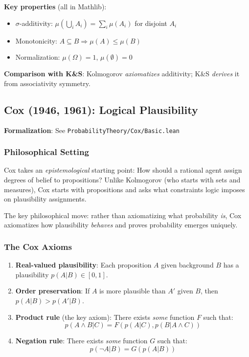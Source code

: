 \documentclass[11pt]{article}
\theoremstyle{definition}
\theoremstyle{remark}
\begin{document}
\textbf{Key properties} (all in Mathlib):
\begin{itemize}
\item $\sigma$-additivity: $\mu(\bigcup_i A_i) = \sum_i \mu(A_i)$ for disjoint $A_i$
\item Monotonicity: $A \subseteq B \Rightarrow \mu(A) \leq \mu(B)$
\item Normalization: $\mu(\Omega) = 1$, $\mu(\emptyset) = 0$
\end{itemize}

\textbf{Comparison with K\&S}: Kolmogorov \emph{axiomatizes} additivity; K\&S \emph{derives} it from associativity symmetry.

\subsection{Cox (1946, 1961): Logical Plausibility}

\textbf{Formalization}: See \texttt{ProbabilityTheory/Cox/Basic.lean}

\subsubsection{Philosophical Setting}

Cox takes an \emph{epistemological} starting point: How should a rational agent assign degrees of belief to propositions?
Unlike Kolmogorov (who starts with sets and measures), Cox starts with propositions and asks what constraints logic imposes on plausibility assignments.

The key philosophical move: rather than axiomatizing what probability \emph{is}, Cox axiomatizes how plausibility \emph{behaves} and proves probability emerges uniquely.

\subsubsection{The Cox Axioms}

\begin{enumerate}
\item \textbf{Real-valued plausibility}: Each proposition $A$ given background $B$ has a plausibility $p(A|B) \in [0,1]$.

\item \textbf{Order preservation}: If $A$ is more plausible than $A'$ given $B$, then $p(A|B) > p(A'|B)$.

\item \textbf{Product rule} (the key axiom): There exists \emph{some} function $F$ such that:
\[p(A \land B | C) = F(p(A|C), p(B|A \land C))\]

\item \textbf{Negation rule}: There exists \emph{some} function $G$ such that:
\[p(\neg A | B) = G(p(A|B))\]
\end{enumerate}
\end{document}
